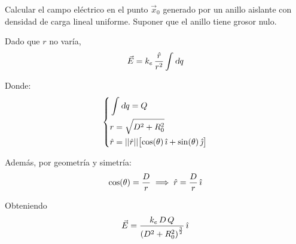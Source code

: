 \begin{mdframed}[style=ExampleFrame]
    \begin{example}
    \end{example}
    \begin{formatI}
        Calcular el campo eléctrico en el punto $\vec{x}_0$ generado por un anillo aislante con densidad de carga lineal uniforme.
        Suponer que el anillo tiene grosor nulo.
    \end{formatI}

    \begin{center}
        \def\svgwidth{\linewidth}
        
    \end{center}

    Dado que $r$ no varía,
    \begin{equation*}
        \vec{E} = k_e \, \frac{\hat{r}}{r^2} \int \textsl{d} q
    \end{equation*}
    
    Donde:
    \begin{equation*}
        \left\{
        \begin{aligned}
            & \int \textsl{d} q = Q
            \\
            & r = \sqrt{D^2 + R_0^2}
            \\
            & \hat{r} = {\left|\left| {\hat{r}} \right|\right|} { \begin{bmatrix} \cos(\theta) \, \hat{\imath} + \sin(\theta) \, \hat{\jmath} \end{bmatrix} }
        \end{aligned}
        \right.
    \end{equation*}

    Además, por geometría y simetría:
    \begin{equation*}
        \cos(\theta) = \frac{D}{r} \implies \hat{r} = \frac{D}{r} \, \hat{\imath}
    \end{equation*}

    Obteniendo
    \begin{equation*}
        \vec{E} = \frac{k_e \, D \, Q}{\left(D^2 + R_0^2\right)^{\frac{3}{2}}} \, \hat{\imath}
    \end{equation*}
\end{mdframed}

